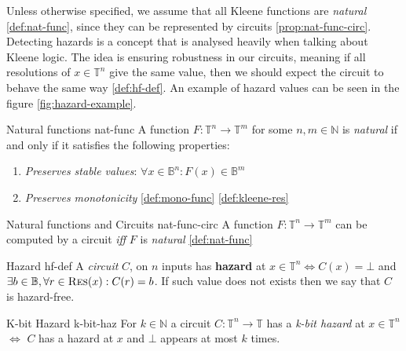Unless otherwise specified, we assume that all Kleene functions are \textit{natural} \ref{def:nat-func}, since
they can be represented by circuits \ref{prop:nat-func-circ}.
Detecting hazards is a concept that is analysed heavily when talking about Kleene logic.
The idea is ensuring robustness in our circuits, meaning if all resolutions of $x \in \mathbb{T}^n$
give the same value, then we should expect the circuit to behave the same way \ref{def:hf-def}.
An example of hazard values can be seen in the figure \ref{fig:hazard-example}.


\begin{definitionbox}{Natural functions \cite{ikenmeyer_ComplexityHazardfreeCircuits_2019}}{nat-func}
    A function $F: \mathbb{T}^n \to \mathbb{T}^m$ for some $n, m \in \mathbb{N}$ is \textit{natural} if and only
    if it satisfies the following properties:
    \begin{enumerate}
        \item \textit{Preserves stable values}: $\forall x \in \mathbb{B}^n: F(x) \in \mathbb{B}^m$
        \item \textit{Preserves monotonicity} \ref{def:mono-func} \ref{def:kleene-res}
    \end{enumerate}
\end{definitionbox}

\begin{propositionbox}{Natural functions and Circuits \cite{mukaidono_BternaryLogicFunction_1972,ikenmeyer_ComplexityHazardfreeCircuits_2019}}{nat-func-circ}
    A function $F: \mathbb{T}^n \to \mathbb{T}^m$ can be computed by a circuit \textit{iff} $F$ is \textit{natural} \ref{def:nat-func}
\end{propositionbox}

\begin{definitionbox}{Hazard \cite{ikenmeyer_ComplexityHazardfreeCircuits_2019, eichelberger_HazardDetectionCombinational_1965}}{hf-def}
    A \textit{circuit} $C$, on $n$ inputs has \textbf{hazard} at $x \in \mathbb{T}^n \iff C(x) = \bot$
    and $\exists b \in \mathbb{B}, \forall r \in \textnormal{\textsc{Res}}(x): C(r) = b$. If such value does not exists
    then we say that $C$ is hazard-free.
\end{definitionbox}


\begin{definitionbox}{K-bit Hazard \cite{ikenmeyer_ComplexityHazardfreeCircuits_2019}}{k-bit-haz}
    For $k \in \mathbb{N}$ a circuit $C: \mathbb{T}^n \to \mathbb{T}$ has a \textit{k-bit hazard} at $x \in \mathbb{T}^n$
    $\iff$ $C$ has a hazard at $x$ and $\bot$ appears at most $k$ times.
\end{definitionbox}
%
%
%
